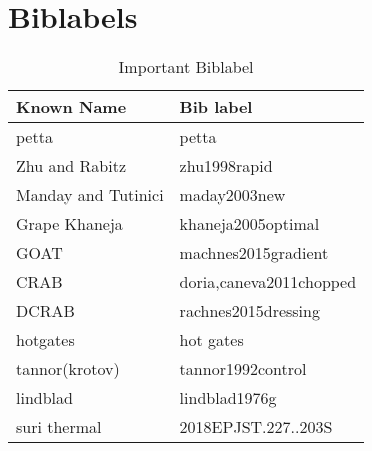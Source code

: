 \documentclass{article}
\begin{document}
\section{Biblabels}
\begin{table}[ht]
\centering
\begin{tabular}{l|l}
Known Name & Bib label \\\hline
petta & petta \\
Zhu and Rabitz & zhu1998rapid\\
Manday and Tutinici & maday2003new\\
Grape Khaneja & khaneja2005optimal\\
GOAT & machnes2015gradient\\
CRAB & doria,caneva2011chopped\\
DCRAB & rachnes2015dressing\\
hotgates & hot gates\\
tannor(krotov) & tannor1992control\\
lindblad & lindblad1976g\\
suri thermal & 2018EPJST.227..203S
\end{tabular}
\caption{\label{tab:Important  Biblabel}Important  Biblabel}
\end{table}
\end{document}
